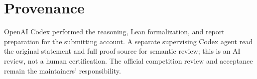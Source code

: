\documentclass[11pt]{article}
\begin{document}
\section{Provenance}
OpenAI Codex performed the reasoning, Lean formalization, and report
preparation for the submitting account. A separate supervising Codex agent
read the original statement and full proof source for semantic review;
this is an AI review, not a human certification. The official competition
review and acceptance remain the maintainers' responsibility.
\end{document}

